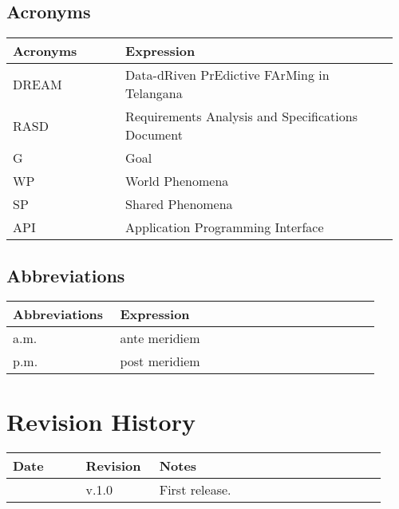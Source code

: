 \subsection{Acronyms}

\begin{center}
	\begin{tabular}{@{}p{0.28\linewidth} p{0.68\linewidth}@{}}
		\toprule
		\textbf{Acronyms}   & \textbf{Expression}\\
		\midrule
		DREAM               & Data-dRiven PrEdictive FArMing in Telangana\\
		RASD                & Requirements Analysis and Specifications Document\\
		G                   & Goal\\
		WP                  & World Phenomena\\
		SP                  & Shared Phenomena\\
		API                 & Application Programming Interface\\
		\bottomrule
	\end{tabular}
\end{center}

\subsection{Abbreviations}

\begin{center}
	\begin{tabular}{@{}p{0.28\linewidth} p{0.68\linewidth}@{}}
		\toprule
		\textbf{Abbreviations}  & \textbf{Expression}\\
		\midrule
	    a.m. & ante meridiem\\
	    p.m. & post meridiem\\
		\bottomrule
	\end{tabular}
\end{center}

\section{Revision History}

\begin{center}
	\begin{tabular}{@{}p{0.18\linewidth} p{0.18\linewidth} p{0.57\linewidth}@{}}
		\toprule
		\textbf{Date}   & \textbf{Revision} & \textbf{Notes}\\
		\midrule
		\date{}         & v.1.0             & First release.\\
		\bottomrule
	\end{tabular}
\end{center}

